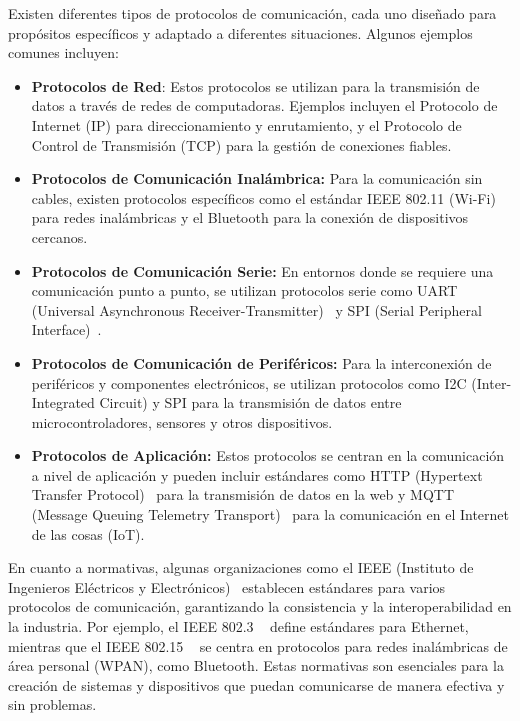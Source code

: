 Existen diferentes tipos de protocolos de comunicación, cada uno diseñado para propósitos específicos y adaptado a diferentes situaciones. Algunos ejemplos comunes incluyen:
\begin{itemize}
\item \textbf{Protocolos de Red}:
Estos protocolos se utilizan para la transmisión de datos a través de redes de computadoras. Ejemplos incluyen el Protocolo de Internet (IP) para direccionamiento y enrutamiento, y el Protocolo de Control de Transmisión (TCP) para la gestión de conexiones fiables.

\item \textbf{Protocolos de Comunicación Inalámbrica:}
	Para la comunicación sin cables, existen protocolos específicos como el estándar IEEE 802.11 (Wi-Fi)~\cite{manual:IEEE802.11} para redes inalámbricas y el Bluetooth para la conexión de dispositivos cercanos.

\item \textbf{Protocolos de Comunicación Serie:}
	En entornos donde se requiere una comunicación punto a punto, se utilizan protocolos serie como UART (Universal Asynchronous Receiver-Transmitter)~\cite{manual:UART} y SPI (Serial Peripheral Interface)~\cite{manual:SPI-I2C}.

\item \textbf{Protocolos de Comunicación de Periféricos:}
Para la interconexión de periféricos y componentes electrónicos, se utilizan protocolos como I2C (Inter-Integrated Circuit) y SPI para la transmisión de datos entre microcontroladores, sensores y otros dispositivos.

\item \textbf{Protocolos de Aplicación:}
	Estos protocolos se centran en la comunicación a nivel de aplicación y pueden incluir estándares como HTTP (Hypertext Transfer Protocol)~\cite{manual:HTTP} para la transmisión de datos en la web y MQTT (Message Queuing Telemetry Transport)~\cite{manual:MQTT} para la comunicación en el Internet de las cosas (IoT).
\end{itemize}

En cuanto a normativas, algunas organizaciones como el IEEE (Instituto de Ingenieros Eléctricos y Electrónicos)~\cite{misc:IEEE} establecen estándares para varios protocolos de comunicación, garantizando la consistencia y la interoperabilidad en la industria. Por ejemplo, el IEEE 802.3 ~\cite{misc:IEEE802_3} define estándares para Ethernet, mientras que el IEEE 802.15 ~\cite{misc:IEEE802_15} se centra en protocolos para redes inalámbricas de área personal (WPAN), como Bluetooth. Estas normativas son esenciales para la creación de sistemas y dispositivos que puedan comunicarse de manera efectiva y sin problemas.

